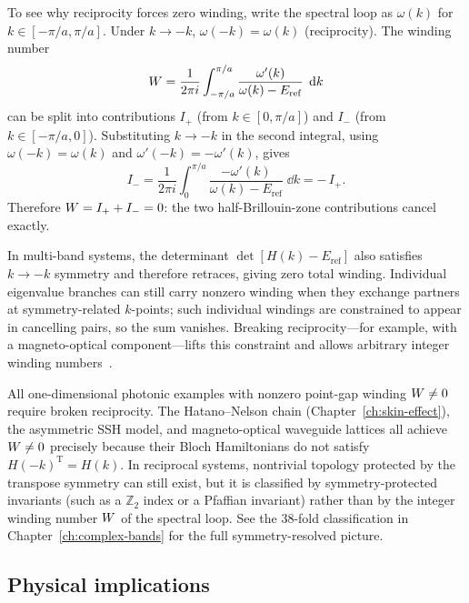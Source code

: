 To see why reciprocity forces zero winding, write the spectral loop
as $\omega(k)$ for $k \in [-\pi/a, \pi/a]$.  Under $k \to -k$,
$\omega(-k) = \omega(k)$ (reciprocity).  The winding number
\begin{equation}
 W = \frac{1}{2\pi i}\int_{-\pi/a}^{\pi/a}
 \frac{\omega'(k)}{\omega(k) - E_{\mathrm{ref}}}\;\mathop{}\!\mathrm{d} k
 \label{eq:winding-integral}
\end{equation}
can be split into contributions $I_+$ (from $k \in [0,\pi/a]$) and
$I_-$ (from $k \in [-\pi/a,0]$).  Substituting $k \to -k$ in the
second integral, using $\omega(-k) = \omega(k)$ and
$\omega'(-k) = -\omega'(k)$, gives
\begin{equation}
 I_- = \frac{1}{2\pi i}\int_{0}^{\pi/a}
 \frac{-\omega'(k)}{\omega(k) - E_{\mathrm{ref}}}\;\dd k
 = -\,I_+.
 \label{eq:winding-cancellation}
\end{equation}
Therefore $W = I_+ + I_- = 0$: the two half-Brillouin-zone
contributions cancel exactly.

In multi-band systems, the determinant
$\det[H(k) - E_{\mathrm{ref}}]$ also satisfies $k \to -k$ symmetry and
therefore retraces, giving zero total winding.  Individual eigenvalue
branches can still carry nonzero winding when they exchange partners at
symmetry-related $k$-points; such individual windings are constrained to
appear in cancelling pairs, so the sum vanishes.  Breaking
reciprocity---for example, with a magneto-optical
component---lifts this constraint and allows arbitrary integer
winding numbers~\cite{longhi2019probing,zhang2021observation,lin2023topological}.

\begin{booknote}
All one-dimensional photonic examples with nonzero point-gap winding
$W \neq 0$ require broken reciprocity.  The Hatano--Nelson chain
(Chapter~\ref{ch:skin-effect}), the asymmetric SSH model, and
magneto-optical waveguide lattices all achieve $W \neq 0$ precisely
because their Bloch Hamiltonians do not satisfy $H(-k)^{\mathrm{T}} = H(k)$.
In reciprocal systems, nontrivial topology protected by the transpose
symmetry can still exist, but it is classified by symmetry-protected
invariants (such as a $\mathbb{Z}_2$ index or a Pfaffian invariant)
rather than by the integer winding number $W$ of the spectral
loop.  See the 38-fold classification in Chapter~\ref{ch:complex-bands}
for the full symmetry-resolved picture.
\end{booknote}

\subsection{Physical implications}
\label{ssec:even-winding-implications}

